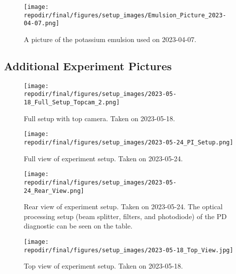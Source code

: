 \begin{figure}[]
\centering
\texttt{[image: \\repodir/final/figures/setup\_images/Emulsion\_Picture\_2023-04-07.png]}
\caption{A picture of the potassium emulsion used on 2023-04-07. }
\label{fig:SI_Emulsion_Picture}
\end{figure}

\clearpage
\subsection{Additional Experiment Pictures}

\begin{figure}[]
\centering
\texttt{[image: \\repodir/final/figures/setup\_images/2023-05-18\_Full\_Setup\_Topcam\_2.png]}
\caption{Full setup with top camera. Taken on 2023-05-18.}
\label{fig:SI_Full_Setup_Topcam}
\end{figure}

\begin{figure}[]
\centering
\texttt{[image: \\repodir/final/figures/setup\_images/2023-05-24\_PI\_Setup.png]}
\caption{Full view of experiment setup. Taken on 2023-05-24.}
\label{fig:SI_Full_Setup_PI}
\end{figure}


\begin{figure}[]
\centering
\texttt{[image: \\repodir/final/figures/setup\_images/2023-05-24\_Rear\_View.png]}
\caption{Rear view of experiment setup. Taken on 2023-05-24. The optical processing setup (beam splitter, filters, and photodiode) of the PD diagnostic can be seen on the table. }
\label{fig:SI_Rear_View}
\end{figure}

\begin{figure}[]
\centering
\texttt{[image: \\repodir/final/figures/setup\_images/2023-05-18\_Top\_View.jpg]}
\caption{Top view of experiment setup. Taken on 2023-05-18.}
\label{fig:SI_Top_View}
\end{figure}


